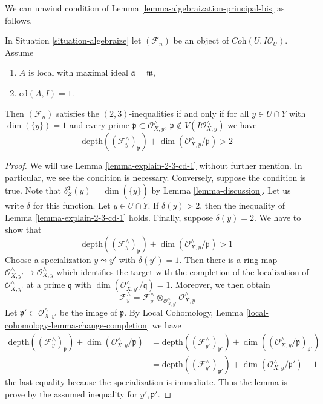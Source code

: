 \noindent
We can unwind condition of
Lemma \ref{lemma-algebraization-principal-bis} as follows.

\begin{lemma}
\label{lemma-unwinding-conditions}
In Situation \ref{situation-algebraize} let $(\mathcal{F}_n)$ be an object
of $\textit{Coh}(U, I\mathcal{O}_U)$. Assume
\begin{enumerate}
\item $A$ is local with maximal ideal $\mathfrak a = \mathfrak m$,
\item $\text{cd}(A, I) = 1$.
\end{enumerate}
Then $(\mathcal{F}_n)$ satisfies the $(2, 3)$-inequalities if and only
if for all $y \in U \cap Y$ with $\dim(\{y\}) = 1$ and every prime
$\mathfrak p \subset \mathcal{O}_{X, y}^\wedge$,
$\mathfrak p \not \in V(I\mathcal{O}_{X, y}^\wedge)$ we have
$$
\text{depth}((\mathcal{F}_y^\wedge)_\mathfrak p) +
\dim(\mathcal{O}_{X, y}^\wedge/\mathfrak p) > 2
$$
\end{lemma}

\begin{proof}
We will use Lemma \ref{lemma-explain-2-3-cd-1}
without further mention. In particular, we see the condition is necessary.
Conversely, suppose the condition is true.
Note that $\delta^Y_Z(y) = \dim(\overline{\{y\}})$ by
Lemma \ref{lemma-discussion}. Let us write $\delta$ for this function.
Let $y \in U \cap Y$. If $\delta(y) > 2$, then the inequality
of Lemma \ref{lemma-explain-2-3-cd-1} holds.
Finally, suppose $\delta(y) = 2$. We have to show that
$$
\text{depth}((\mathcal{F}_y^\wedge)_\mathfrak p) +
\dim(\mathcal{O}_{X, y}^\wedge/\mathfrak p) > 1
$$
Choose a specialization $y \leadsto y'$ with $\delta(y') = 1$. Then
there is a ring map $\mathcal{O}_{X, y'}^\wedge \to \mathcal{O}_{X, y}^\wedge$
which identifies the target with the completion of the localization
of $\mathcal{O}_{X, y'}^\wedge$ at a prime $\mathfrak q$
with $\dim(\mathcal{O}_{X, y'}^\wedge/\mathfrak q) = 1$.
Moreover, we then obtain
$$
\mathcal{F}_y^\wedge =
\mathcal{F}_{y'}^\wedge
\otimes_{\mathcal{O}_{X, y'}^\wedge}
\mathcal{O}_{X, y}^\wedge
$$
Let $\mathfrak p' \subset \mathcal{O}_{X, y'}^\wedge$ be the image
of $\mathfrak p$.
By Local Cohomology, Lemma \ref{local-cohomology-lemma-change-completion}
we have
\begin{align*}
\text{depth}((\mathcal{F}_y^\wedge)_\mathfrak p) +
\dim(\mathcal{O}_{X, y}^\wedge/\mathfrak p)
& =
\text{depth}((\mathcal{F}_{y'}^\wedge)_{\mathfrak p'}) +
\dim((\mathcal{O}_{X, y}^\wedge/\mathfrak p)_{\mathfrak p'}) \\
& =
\text{depth}((\mathcal{F}_{y'}^\wedge)_{\mathfrak p'}) +
\dim(\mathcal{O}_{X, y}^\wedge/\mathfrak p') - 1
\end{align*}
the last equality because the specialization is immediate.
Thus the lemma is prove by the assumed inequality for $y', \mathfrak p'$.
\end{proof}

